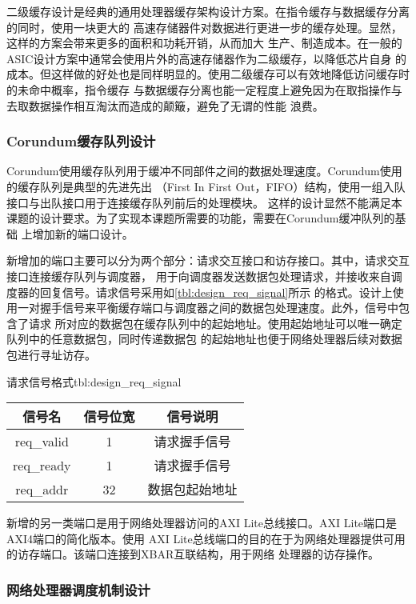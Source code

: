 二级缓存设计是经典的通用处理器缓存架构设计方案。在指令缓存与数据缓存分离的同时，使用一块更大的
高速存储器件对数据进行更进一步的缓存处理。显然，这样的方案会带来更多的面积和功耗开销，从而加大
生产、制造成本。在一般的ASIC设计方案中通常会使用片外的高速存储器作为二级缓存，以降低芯片自身
的成本。但这样做的好处也是同样明显的。使用二级缓存可以有效地降低访问缓存时的未命中概率，指令缓存
与数据缓存分离也能一定程度上避免因为在取指操作与去取数据操作相互淘汰而造成的颠簸，避免了无谓的性能
浪费。

\subsubsection{Corundum缓存队列设计}

Corundum使用缓存队列用于缓冲不同部件之间的数据处理速度。Corundum使用的缓存队列是典型的先进先出
（First In First Out，FIFO）结构，使用一组入队接口与出队接口用于连接缓存队列前后的处理模块。
这样的设计显然不能满足本课题的设计要求。为了实现本课题所需要的功能，需要在Corundum缓冲队列的基础
上增加新的端口设计。

新增加的端口主要可以分为两个部分：请求交互接口和访存接口。其中，请求交互接口连接缓存队列与调度器，
用于向调度器发送数据包处理请求，并接收来自调度器的回复信号。请求信号采用如\autoref{tbl:design_req_signal}所示
的格式。设计上使用一对握手信号来平衡缓存端口与调度器之间的数据包处理速度。此外，信号中包含了请求
所对应的数据包在缓存队列中的起始地址。使用起始地址可以唯一确定队列中的任意数据包，同时传递数据包
的起始地址也便于网络处理器后续对数据包进行寻址访存。

\begin{generaltab}{请求信号格式}{tbl:design_req_signal}
  \begin{tabular}{ccc}
    \toprule
    信号名 & 信号位宽 & 信号说明 \\
    \midrule
    req\_valid & 1 & 请求握手信号 \\
    req\_ready & 1 & 请求握手信号 \\
    req\_addr & 32 & 数据包起始地址 \\
    \bottomrule
  \end{tabular}
\end{generaltab}

新增的另一类端口是用于网络处理器访问的AXI Lite总线接口。AXI Lite端口是AXI4端口的简化版本\cite{intro_amba_axi}。使用
AXI Lite总线端口的目的在于为网络处理器提供可用的访存端口。该端口连接到XBAR互联结构，用于网络
处理器的访存操作。

\subsubsection{网络处理器调度机制设计}

